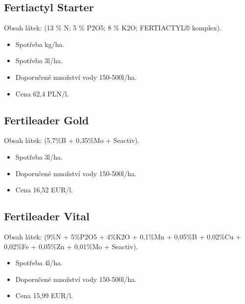 \subsection{Fertiactyl Starter}
Obsah látek: (13 \% N; 5 \% P2O5; 8 \% K2O; FERTIACTYL® komplex).
\begin{itemize}
  \item Spotřeba kg/ha.
  \item Spotřeba 3l/ha.
  \item Doporučené množství vody 150-500l/ha.
  \item Cena 62,4 PLN/l.
\end{itemize}

\subsection{Fertileader Gold}
Obsah látek: (5,7\%B + 0,35\%Mo + Seactiv).
\begin{itemize}
  \item Spotřeba 3l/ha.
  \item Doporučené množství vody 150-500l/ha.
  \item Cena 16,52 EUR/l.
\end{itemize}

\subsection{Fertileader Vital}
Obsah látek: (9\%N + 5\%P2O5 + 4\%K2O + 0,1\%Mn + 0,05\%B + 0,02\%Cu + 0,02\%Fe + 0,05\%Zn + 0,01\%Mo + Seactiv).
\begin{itemize}
  \item Spotřeba 4l/ha.
  \item Doporučené množství vody 150-500l/ha.
  \item Cena 15,99 EUR/l.
\end{itemize}
